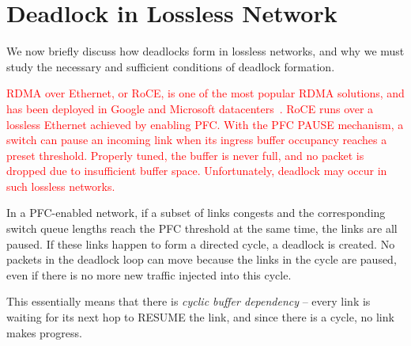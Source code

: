 \section{Deadlock in Lossless Network}

We now briefly discuss how deadlocks form in lossless networks, and why we must
study the necessary and sufficient conditions of deadlock formation.


 \textcolor{red}{RDMA over Ethernet, or RoCE, is one of the most popular RDMA solutions, and has been
deployed in Google and Microsoft datacenters~\cite{dcqcn, timely}.  RoCE runs over a lossless Ethernet achieved by enabling PFC. With the PFC PAUSE mechanism, a switch can pause
an incoming link when its ingress buffer occupancy reaches a preset threshold.
Properly tuned, the buffer is never full, and no packet is dropped due to
insufficient buffer space.  Unfortunately, deadlock may occur in such lossless
networks.}

 In a PFC-enabled
network, if a subset of links congests and the corresponding switch queue
lengths reach the PFC threshold at the same time, the links are all paused. If
these links happen to form a directed cycle, a deadlock is created.  No packets
in the deadlock loop can move because the links in the cycle are paused, even if
there is no more new traffic injected into this cycle.

This essentially means that there is {\em cyclic buffer dependency} -- every
link is waiting for its next hop to RESUME the link, and since there is a cycle,
no link makes progress.

